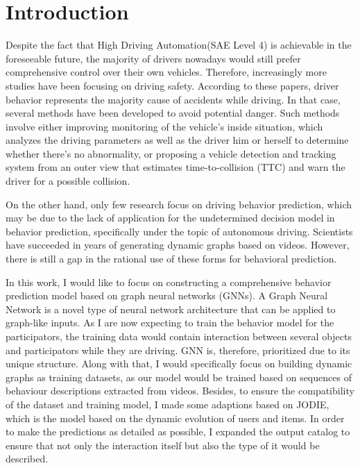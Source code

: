 
\chapter{Introduction}\label{chapter:introduction}
Despite the fact that High Driving Automation(SAE Level 4) is achievable in the foreseeable future\cite{inagaki2019critique}, the majority of drivers nowadays would still prefer comprehensive control over their own vehicles. Therefore, increasingly more studies have been focusing on driving safety\cite{lee2005driving,lee2008fifty}. 
According to these papers, driver behavior represents the majority cause of accidents while driving. In that case, several methods have been developed to avoid potential danger. Such methods involve either improving monitoring of the vehicle's inside situation, which analyzes the driving parameters as well as the driver him or herself to determine whether there's no abnormality\cite{karrouchi2023driving}, or proposing a vehicle detection and tracking system from an outer view that estimates time-to-collision (TTC) and warn the driver for a possible collision\cite{aytekin2010increasing}.

On the other hand, only few research focus on driving behavior prediction, which may be due to the lack of application for the undetermined decision model in behavior prediction, specifically under the topic of autonomous driving. Scientists have succeeded in years of generating dynamic graphs based on videos. However, there is still a gap in the rational use of these forms for behavioral prediction.

In this work, I would like to focus on constructing a comprehensive behavior prediction model based on graph neural networks (GNNs). A Graph Neural Network is a novel type of neural network architecture that can be applied to graph-like inputs. As I are now expecting to train the behavior model for the participators, the training data would contain interaction between several objects and participators while they are driving. GNN is, therefore, prioritized due to its unique structure. Along with that, I would specifically focus on building dynamic graphs as training datasets, as our model would be trained based on sequences of behaviour descriptions extracted from videos.
Besides, to ensure the compatibility of the dataset and training model, I made some adaptions based on JODIE\cite{kumar2019predicting}, which is the model based on the dynamic evolution of users and items. In order to make the predictions as detailed as possible, I expanded the output catalog to ensure that not only the interaction itself but also the type of it would be described.

